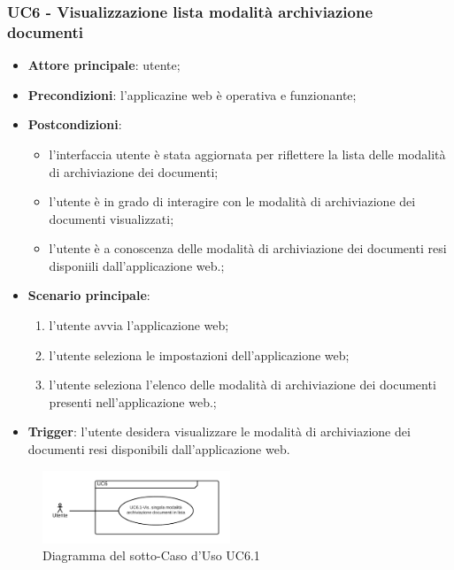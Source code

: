 \documentclass[10pt, a4paper]{article}
\begin{document}
    \subsubsection{UC6 - Visualizzazione lista modalità archiviazione documenti}
    \begin{itemize}
        \item \textbf{Attore principale}: utente;
        \item \textbf{Precondizioni}: l'applicazine web è operativa e funzionante;
        \item \textbf{Postcondizioni}: 
        \begin{itemize}
            \item l'interfaccia utente è stata aggiornata per riflettere la lista delle modalità di archiviazione dei documenti;
            \item l'utente è in grado di interagire con le modalità di archiviazione dei documenti visualizzati;
            \item l'utente è a conoscenza delle modalità di archiviazione dei documenti resi disponiili dall'applicazione web.;
        \end{itemize}
        \item \textbf{Scenario principale}:
            \begin{enumerate}
                \item l'utente avvia l'applicazione web;
                \item l'utente seleziona le impostazioni dell'applicazione web;
                \item l'utente seleziona l'elenco delle modalità di archiviazione dei documenti presenti nell'applicazione web.;
            \end{enumerate}
        \item \textbf{Trigger}: l'utente desidera visualizzare le modalità di archiviazione dei documenti resi disponibili dall'applicazione web.
    \end{itemize}

    \begin{figure}[h]
        \centering
        \includegraphics[width=0.5\textwidth, height=0.5\textheight, keepaspectratio]{UC-images/UC6.1.png}
        \caption{Diagramma del sotto-Caso d'Uso UC6.1}
    \end{figure}
\end{document}
